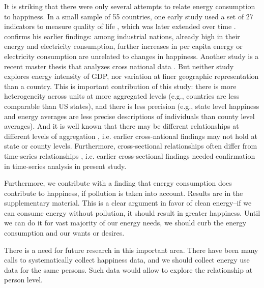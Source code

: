 \documentclass[10pt, letterpaper]{article}
\begin{document}
\begin{spacing}{1.0}
It is striking that there were only several attempts to
relate energy consumption to happiness.   %
 In a small sample of 55 countries, one early study used a set of 27 indicators to measure
 quality of life \citep{mazur74}, which was later extended over time
 \citep{mazur11}. \citet{mazur13} confirms his earlier findings: among
 industrial nations, already high in their energy and electricity consumption,
 further increases in per capita energy or electricity consumption are unrelated
 to changes in happiness. 
 Another study is a recent master
 thesis that  analyzes cross national data \citep{winfrey13}. But neither
 study  explores energy intensity of GDP, nor variation at finer geographic
 representation than a country. This is important contribution of this study:
 there is more heterogeneity across units at more aggregated levels (e.g.,
 countries are less comparable than US states), and there is less precision
 (e.g., state level happiness and energy averages are less precise descriptions
 of individuals than county level averages). And it is well known that there
 may be different relationships at different levels of aggregation
 \citep[e.g.,][]{ashkanasy11}, i.e. earlier cross-national findings may not hold
 at state or county levels. Furthermore, cross-sectional relationships often
 differ from time-series relationships \citep{easterlin12}, i.e. earlier
 cross-sectional findings needed confirmation in time-series analysis in present study. 

Furthermore, we contribute with a finding that energy consumption does contribute to happiness, if pollution is
taken into account. Results are in the supplementary material. This is a clear argument in favor of clean energy--if we can
consume energy without pollution, it should result in greater happiness. Until
we can do it for vast majority of our energy needs, we should curb the energy consumption and
our wants or desires.

There is a need for future research in this important area. There have been many
calls to systematically collect happiness data, and we should collect energy use data for the same persons. Such data would allow
to explore the relationship  at person level. %



\end{spacing}
\end{document}
